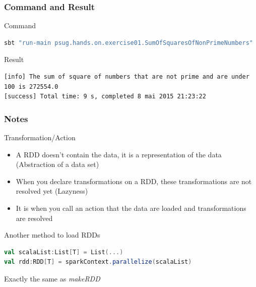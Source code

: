 \documentclass[slidetop,9pt,utf8]{beamer}
\begin{document}
\begin{frame}[fragile]
  \frametitle{Command and Result}

  \begin{block}{Command}
    \begin{lstlisting}[language=bash, style=terminal-medium, basicstyle=\footnotesize\color{white}\ttfamily]
sbt "run-main psug.hands.on.exercise01.SumOfSquaresOfNonPrimeNumbers"
    \end{lstlisting}
  \end{block}

  \begin{block}{Result}
    \begin{lstlisting}[style=terminal]
[info] The sum of square of numbers that are not prime and are under 100 is 272554.0
[success] Total time: 9 s, completed 8 mai 2015 21:23:22
    \end{lstlisting}
  \end{block}

\end{frame}

\begin{frame}[fragile]
  \frametitle{Notes}

  \begin{exampleblock}{Transformation/Action}
    \begin{itemize}
      \item A RDD doesn't contain the data, it is a representation of the data (Abstraction of a data set)
      \item When you declare transformations on a RDD, these transformations are not resolved yet (Lazyness)
      \item It is when you call an action that the data are loaded and transformations are resolved
    \end{itemize}
  \end{exampleblock}

  \begin{exampleblock}{Another method to load RDDs}
    \begin{lstlisting}[language=scala, style=code]
val scalaList:List[T] = List(...)
val rdd:RDD[T] = sparkContext.parallelize(scalaList)
    \end{lstlisting}
    Exactly the same as \textit{makeRDD}
  \end{exampleblock}

\end{frame}

%
%
%
%
\end{document}
